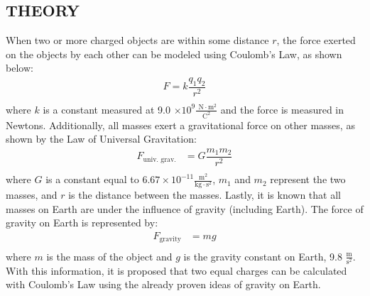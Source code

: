 \documentclass [12pt, letterpaper, twoside]{article}
\begin{document}
\subsection*{THEORY}
When two or more charged objects are within some distance \(r\), the force exerted on the objects by each other can be modeled using Coulomb's Law, as shown below:
\begin{equation}
  \begin{split}
    F = k\dfrac{q_{1}q_{2}}{r^2} \\
  \end{split}
\end{equation}
where \(k\) is a constant measured at 9.0 \(\times 10^9 \tfrac{\text{ N}\cdot\text{m}^2}{\text{C}^2}\) and the force is measured in Newtons. Additionally, all masses exert a gravitational force on other masses, as shown by the Law of Universal Gravitation:
\begin{equation}
  \begin{split}
    F_{\text{univ. grav.}} &= G\dfrac{m_{1}m_{2}}{r^2} \\
  \end{split}
\end{equation}
where \(G\) is a constant equal to \(6.67\times{10^{-11}}\tfrac{\text{m}^2}{\text{kg}\cdot{\text{s}^2}}\), \(m_{1}\) and \(m_{2}\) represent the two masses, and \(r\) is the distance between the masses. Lastly, it is known that all masses on Earth are under the influence of gravity (including Earth). The force of gravity on Earth is represented by:
\begin{equation}
  \begin{split}
    F_{\text{gravity}} &= mg \\
  \end{split}
\end{equation}
where \(m\) is the mass of the object and \(g\) is the gravity constant on Earth, 9.8 \(\tfrac{\text{m}}{\text{s}^2}\). With this information, it is proposed that two equal charges can be calculated with Coulomb's Law using the already proven ideas of gravity on Earth.
\end{document}
